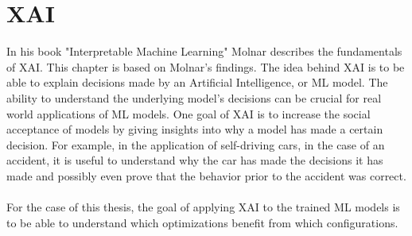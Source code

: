 \chapter{XAI}\label{chapter:xai}

In his book "Interpretable Machine Learning" \parencite{molnar2022} Molnar describes the fundamentals of \ac{XAI}. This chapter is based on Molnar's findings. The idea behind \ac{XAI} is to be able to explain decisions made by an Artificial Intelligence, or \ac{ML} model. The ability to understand the underlying model's decisions can be crucial for real world applications of \ac{ML} models. One goal of \ac{XAI} is to increase the social acceptance of models by giving insights into why a model has made a certain decision. For example, in the application of self-driving cars, in the case of an accident, it is useful to understand why the car has made the decisions it has made and possibly even prove that the behavior prior to the accident was correct.
\\\\
For the case of this thesis, the goal of applying \ac{XAI} to the trained \ac{ML} models is to be able to understand which optimizations benefit from which configurations. 

